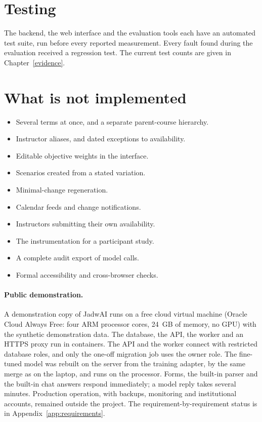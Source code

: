 \section{Testing}

The backend, the web interface and the evaluation tools each have an automated test suite, run before every reported measurement. Every fault found during the evaluation received a regression test. The current test counts are given in Chapter~\ref{evidence}.

\section{What is not implemented}

\begin{itemize}
\item Several terms at once, and a separate parent-course hierarchy.
\item Instructor aliases, and dated exceptions to availability.
\item Editable objective weights in the interface.
\item Scenarios created from a stated variation.
\item Minimal-change regeneration.
\item Calendar feeds and change notifications.
\item Instructors submitting their own availability.
\item The instrumentation for a participant study.
\item A complete audit export of model calls.
\item Formal accessibility and cross-browser checks.
\end{itemize}
\paragraph{Public demonstration.} A demonstration copy of JadwAI runs on a free cloud virtual machine (Oracle Cloud Always Free: four ARM processor cores, 24~GB of memory, no GPU) with the synthetic demonstration data. The database, the API, the worker and an HTTPS proxy run in containers. The API and the worker connect with restricted database roles, and only the one-off migration job uses the owner role. The fine-tuned model was rebuilt on the server from the training adapter, by the same merge as on the laptop, and runs on the processor. Forms, the built-in parser and the built-in chat answers respond immediately; a model reply takes several minutes. Production operation, with backups, monitoring and institutional accounts, remained outside the project. The requirement-by-requirement status is in Appendix~\ref{app:requirements}.
